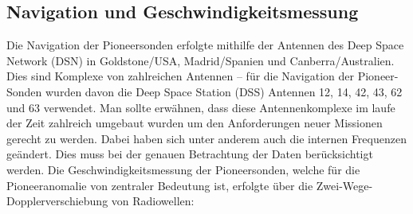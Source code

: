 
\subsection{Navigation und Geschwindigkeitsmessung}
Die Navigation der Pioneersonden erfolgte mithilfe der Antennen des Deep Space Network (DSN) in Goldstone/USA, Madrid/Spanien und Canberra/Australien. Dies sind Komplexe von zahlreichen Antennen – für die Navigation der Pioneer-Sonden wurden davon die Deep Space Station (DSS) Antennen 12, 14, 42, 43, 62 und 63 verwendet.\cite{Anderson2002}
Man sollte erwähnen, dass diese Antennenkomplexe im laufe der Zeit zahlreich umgebaut wurden um den Anforderungen neuer Missionen gerecht zu werden. Dabei haben sich unter anderem auch die internen Frequenzen geändert\cite{Anderson2002}. Dies muss bei der genauen Betrachtung der Daten berücksichtigt werden.
Die Geschwindigkeitsmessung der Pioneersonden, welche für die Pioneeranomalie von zentraler Bedeutung ist, erfolgte über die Zwei-Wege-Dopplerverschiebung von Radiowellen:

